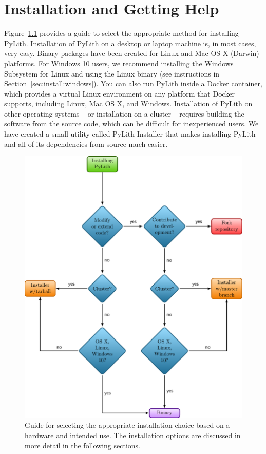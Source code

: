 \chapter{Installation and Getting Help}
\label{cha:installation}

Figure~\ref{fig:install:choices} provides a guide to select the
appropriate method for installing PyLith.  Installation of PyLith on a
desktop or laptop machine is, in most cases, very easy. Binary
packages have been created for Linux and Mac OS X (Darwin) platforms. For
Windows 10 users, we recommend installing the Windows Subsystem for
Linux and using the Linux binary (see instructions in
Section~\ref{sec:install:windows}). You can also run PyLith
inside a Docker container, which provides a virtual Linux environment
on any platform that Docker supports, including Linux, Mac OS X, and
Windows. Installation of PyLith on other operating systems -- or
installation on a cluster -- requires building the software from the
source code, which can be difficult for inexperienced users. We have
created a small utility called PyLith Installer that makes installing
PyLith and all of its dependencies from source much easier.

\begin{figure}[htbp]
  \includegraphics[scale=0.8]{install/figs/installchoices} 
  \caption{Guide for selecting the appropriate installation choice
  based on a hardware and intended use. The installation options are
  discussed in more detail in the following sections.}
\label{fig:install:choices} 
\end{figure}

